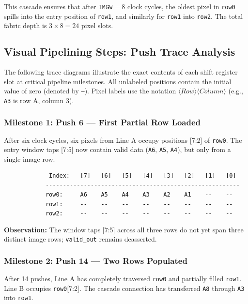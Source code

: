 \documentclass[11pt,a4paper]{report}
\begin{document}
This cascade ensures that after $\mathtt{IMGW} = 8$ clock cycles, the oldest pixel in \texttt{row0} spills into the entry position of \texttt{row1}, and similarly for \texttt{row1} into \texttt{row2}. The total fabric depth is $3 \times 8 = 24$ pixel slots.

\subsection{Visual Pipelining Steps: Push Trace Analysis}

The following trace diagrams illustrate the exact contents of each shift register slot at critical pipeline milestones. All unlabeled positions contain the initial value of zero (denoted by \texttt{--}). Pixel labels use the notation $\langle\mathit{Row}\rangle\langle\mathit{Column}\rangle$ (e.g., \texttt{A3} is row A, column 3).

\subsubsection{Milestone 1: Push 6 --- First Partial Row Loaded}

After six clock cycles, six pixels from Line A occupy positions [7:2] of \texttt{row0}. The entry window taps [7:5] now contain valid data (\texttt{A6}, \texttt{A5}, \texttt{A4}), but only from a single image row.

\begin{verbatim}
             Index:   [7]   [6]   [5]   [4]   [3]   [2]   [1]   [0]
            --------------------------------------------------------
            row0:     A6    A5    A4    A3    A2    A1    --    --
            row1:     --    --    --    --    --    --    --    --
            row2:     --    --    --    --    --    --    --    --
\end{verbatim}

\textbf{Observation:} The window taps [7:5] across all three rows do not yet span three distinct image rows; \texttt{valid\_out} remains deasserted.

\subsubsection{Milestone 2: Push 14 --- Two Rows Populated}

After 14 pushes, Line A has completely traversed \texttt{row0} and partially filled \texttt{row1}. Line B occupies \texttt{row0}[7:2]. The cascade connection has transferred \texttt{A8} through \texttt{A3} into \texttt{row1}.
\end{document}
